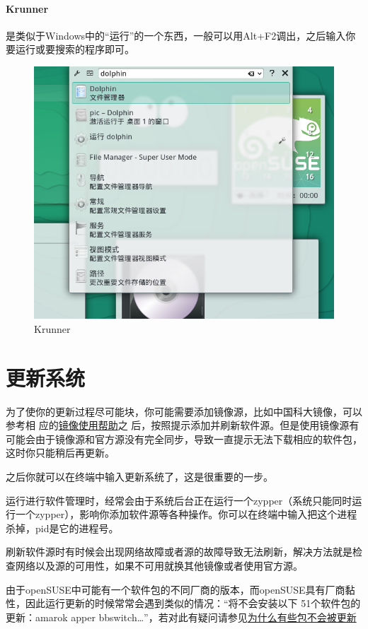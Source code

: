\paragraph{Krunner} 是类似于Windows中的“运行”的一个东西，一般可以用Alt+F2调出，之后输入你要运行或要搜索的程序即可。
\begin{figure}[htbp!]
\centering
\includegraphics[width=\textwidth]{./pic/krunner.png} 
\caption{Krunner}
\end{figure}
\section{更新系统}
为了使你的更新过程尽可能块，你可能需要添加镜像源，比如中国科大镜像，可以参考相
应的\href{https://lug.ustc.edu.cn/wiki/mirrors/help/opensuse}{镜像使用帮助}之
后，按照提示添加并刷新软件源。但是使用镜像源有可能会由于镜像源和官方源没有完全同步，导致一直提示无法下载相应的软件包，这时你只能稍后再更新。

之后你就可以在终端中输入更新系统了，这是很重要的一步。

运行\zy 进行软件管理时，经常会由于系统后台正在运行一个zypper（系统只能同时运行一个zypper），影响你添加软件源等各种操作。你可以在终端中输入把这个进程杀掉，pid是它的进程号。

刷新软件源时有时候会出现网络故障或者源的故障导致无法刷新，解决方法就是检查网络以及源的可用性，如果不可用就换其他镜像或者使用官方源。

由于openSUSE中可能有一个软件包的不同厂商的版本，而openSUSE具有厂商黏性，因此运行更新的时候常常会遇到类似的情况：“将不会安装以下 51个软件包的更新：amarok apper bbswitch\ldots”，若对此有疑问请参见\href{https://forum.suse.org.cn/viewtopic.php?t=2777&p=21896}{为什么有些包不会被更新}
